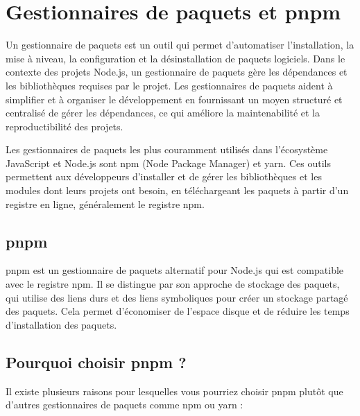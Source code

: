 \section{Gestionnaires de paquets et pnpm}

Un gestionnaire de paquets est un outil qui permet d'automatiser l'installation, la mise à niveau, la configuration et la désinstallation de paquets logiciels. Dans le contexte des projets Node.js, un gestionnaire de paquets gère les dépendances et les bibliothèques requises par le projet. Les gestionnaires de paquets aident à simplifier et à organiser le développement en fournissant un moyen structuré et centralisé de gérer les dépendances, ce qui améliore la maintenabilité et la reproductibilité des projets.

Les gestionnaires de paquets les plus couramment utilisés dans l'écosystème JavaScript et Node.js sont npm (Node Package Manager) et yarn. Ces outils permettent aux développeurs d'installer et de gérer les bibliothèques et les modules dont leurs projets ont besoin, en téléchargeant les paquets à partir d'un registre en ligne, généralement le registre npm.

\subsection{pnpm}

pnpm est un gestionnaire de paquets alternatif pour Node.js qui est compatible avec le registre npm. Il se distingue par son approche de stockage des paquets, qui utilise des liens durs et des liens symboliques pour créer un stockage partagé des paquets. Cela permet d'économiser de l'espace disque et de réduire les temps d'installation des paquets.

\subsection{Pourquoi choisir pnpm ?}

Il existe plusieurs raisons pour lesquelles vous pourriez choisir pnpm plutôt que d'autres gestionnaires de paquets comme npm ou yarn :


